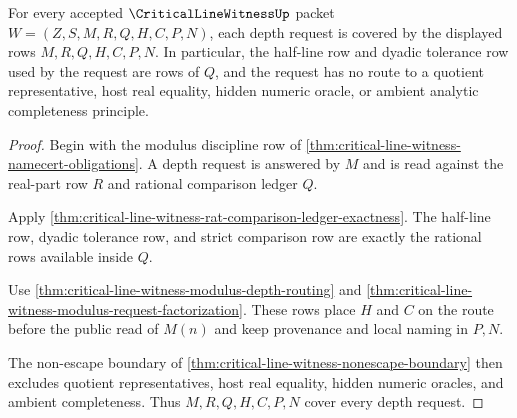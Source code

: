 \begin{theorem}
\label{thm:critical-line-witness-depth-ledger-coverage}
For every accepted $\CriticalLineWitnessUp$ packet $W=(Z,S,M,R,Q,H,C,P,N)$, each depth request is covered by the displayed rows $M,R,Q,H,C,P,N$. In particular, the half-line row and dyadic tolerance row used by the request are rows of $Q$, and the request has no route to a quotient representative, host real equality, hidden numeric oracle, or ambient analytic completeness principle.
\end{theorem}
\begin{proof}
Begin with the modulus discipline row of \autoref{thm:critical-line-witness-namecert-obligations}. A depth request is answered by $M$ and is read against the real-part row $R$ and rational comparison ledger $Q$.

Apply \autoref{thm:critical-line-witness-rat-comparison-ledger-exactness}. The half-line row, dyadic tolerance row, and strict comparison row are exactly the rational rows available inside $Q$.

Use \autoref{thm:critical-line-witness-modulus-depth-routing} and \autoref{thm:critical-line-witness-modulus-request-factorization}. These rows place $H$ and $C$ on the route before the public read of $M(n)$ and keep provenance and local naming in $P,N$.

The non-escape boundary of \autoref{thm:critical-line-witness-nonescape-boundary} then excludes quotient representatives, host real equality, hidden numeric oracles, and ambient completeness. Thus $M,R,Q,H,C,P,N$ cover every depth request.
\end{proof}

